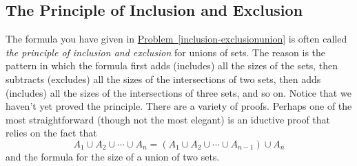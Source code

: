 \documentclass[10pt,]{book}
\theoremstyle{plain}
\theoremstyle{definition}
\theoremstyle{definition}
\numberwithin{equation}{chapter}
\begin{document}
\subsection[{The Principle of Inclusion and Exclusion}]{The Principle of Inclusion and Exclusion}\label{subsection-45}
The formula you have given in \hyperref[inclusion-exclusionunion]{Problem~\ref{inclusion-exclusionunion}} is often called \emph{the principle of inclusion and exclusion} for unions of sets. The reason is the pattern in which the formula first adds (includes) all the sizes of the sets, then subtracts (excludes) all the sizes of the intersections of two sets, then adds (includes) all the sizes of the intersections of three sets, and so on.   Notice that we haven't yet proved the principle. There are a variety of proofs.  Perhaps one of the most straightforward (though not the most elegant) is an iductive proof that relies on the fact that%
\begin{equation*}
A_1 \cup A_2 \cup \cdots \cup A_n = \left(A_1 \cup A_2 \cup \cdots \cup A_{n-1}\right) \cup A_n
\end{equation*}
and the formula for the size of a union of two sets.%
\end{document}
